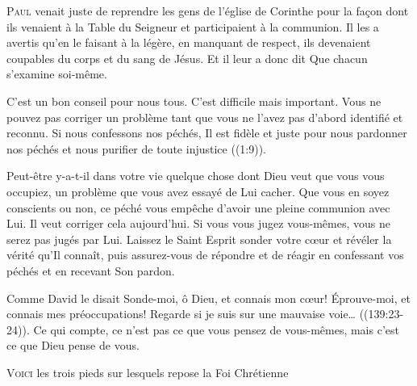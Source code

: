 \lettrine{P}{aul} venait juste de reprendre
 les gens de l'église de  Corinthe
 pour la fa\c{c}on dont ils venaient à la Table du Seigneur
 et participaient à la communion.
 Il les a avertis qu'en le faisant à la légère,
 en manquant de respect, ils devenaient coupables
 du corps et du sang de Jésus.
 Et il leur a donc dit\frcolon{} 
 \Og Que chacun s'examine soi-même. \Fg{}

C'est un bon conseil pour nous tous. C'est difficile mais important.
 Vous ne pouvez pas corriger un problème tant que vous ne l'avez pas
 d'abord identifié et reconnu.
 \Og Si nous confessons nos péchés, Il est fidèle et juste
 pour nous pardonner nos péchés et nous purifier
 de toute injustice \Fg{} ((1:9)).


Peut-être y-a-t-il dans votre vie quelque chose dont Dieu
 veut que vous vous occupiez, un problème que vous avez essayé
 de Lui cacher.
 Que vous en soyez conscients ou non,
 ce péché vous empêche d'avoir une pleine communion avec Lui.
 Il veut corriger cela aujourd'hui.
 Si vous vous jugez vous-mêmes, vous ne serez pas jugés par Lui.
 Laissez le Saint Esprit sonder votre c\oe{}ur et révéler la vérité
 qu'Il connaît, puis assurez-vous de répondre et de réagir
 en confessant vos péchés et en recevant Son pardon.

Comme David le disait\frcolon{} 
 \Og Sonde-moi, ô Dieu, et connais mon c\oe{}ur!
 Éprouve-moi, et connais mes préoccupations!
 Regarde si je suis sur une mauvaise voie\dots{} \Fg{}
 ((139:23-24)).
 Ce qui compte, ce n'est pas ce que vous pensez de vous-mêmes,
 mais c'est ce que Dieu pense de vous.

\dvrule







\lettrine[lhang=0.8]{V}{oici} les trois pieds sur lesquels
 repose la Foi Chrétienne\frcolon{}

